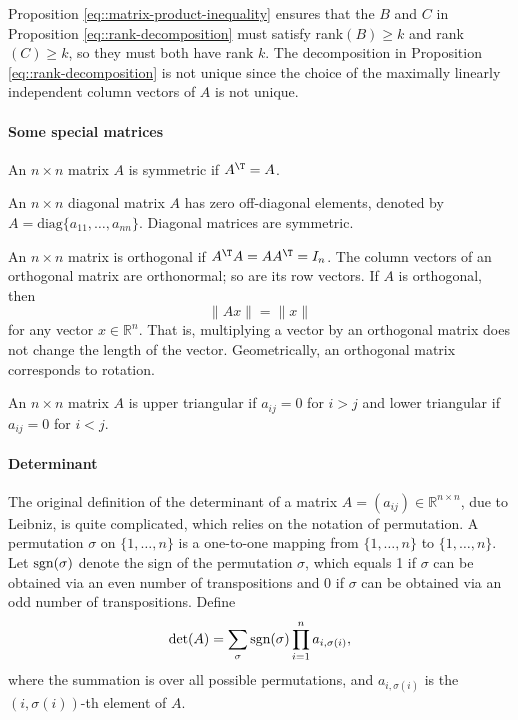 Proposition \ref{eq::matrix-product-inequality} ensures that the $B$ and $C$ in Proposition \ref{eq::rank-decomposition} must satisfy rank$(B) \geq k$ and rank$(C) \geq k$, so they must both have rank $k$. The decomposition in Proposition \ref{eq::rank-decomposition} is not unique since the choice of the maximally linearly independent column vectors of $A$ is not unique. 


\paragraph*{Some special matrices}

An $n\times n$ matrix $A$ is symmetric if $A^{\T}=A$. 


An $n\times n$ diagonal matrix $A$ has zero off-diagonal elements,
denoted by $A=\text{diag}\{a_{11},\ldots,a_{nn}\}.$
Diagonal matrices are symmetric. 

An $n\times n$
matrix is orthogonal if $A^{\T}A=AA^{\T}=I_{n}$. The column vectors of an orthogonal matrix are orthonormal; so are its row vectors. If $A$ is orthogonal, then 
$$
\| A x \|  = \|x\|
$$
for any vector $x\in \mathbb{R}^n$. That is, multiplying a vector by an orthogonal matrix does not change the length of the vector. Geometrically, an orthogonal matrix corresponds to rotation. 




An $n\times n$ matrix $A$ is upper triangular if $a_{ij} = 0$ for $i > j$ and lower triangular if $a_{ij} = 0$ for $i < j$. 



\paragraph*{Determinant}

The original definition of the determinant of a matrix $A = (a_{ij}) \in \mathbb{R}^{n\times n}$, due to Leibniz, is quite complicated, which relies on the notation of permutation. A permutation $\sigma$  on $\{1, \ldots, n\} $ is a one-to-one mapping from $\{1, \ldots, n\} $ to $\{1, \ldots, n\} $. Let $\textup{sgn}(\sigma)$ denote the sign of the permutation $\sigma$, which equals 1 if $\sigma$ can be obtained via an even number of transpositions and 0 if $\sigma$ can be obtained via an odd number of transpositions. Define
\[
\textup{det}(A) = \sum_{\sigma } \textup{sgn}(\sigma) \prod_{i=1}^{n} a_{i,\sigma(i)},
\]
where the summation is over all possible permutations, and
$a_{i,\sigma(i)}$ is the $(i,\sigma(i))$-th element of $A$. 


